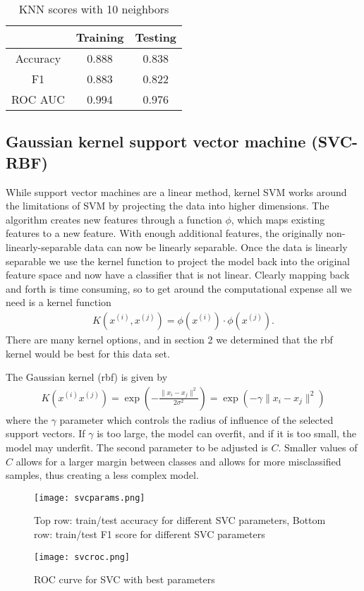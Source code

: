\documentclass[12pt]{article}
\begin{document}
\begin{table}[h!]
	\centering
	\begin{tabular}{| c|cc|} 
		\hline
		& Training & Testing\\ \hline
		Accuracy & 0.888& 0.838\\ 
		F1 &  0.883 &0.822\\ 
		ROC AUC & 0.994 & 0.976\\
		\hline
	\end{tabular}
	\caption{KNN scores with 10 neighbors}
	\label{table: 6}
\end{table}
\FloatBarrier

\subsection{Gaussian kernel support vector machine (SVC-RBF)}

While support vector machines are a linear method, kernel SVM works around the limitations of SVM by projecting the data into higher dimensions. The algorithm creates new features through a function $\phi$, which maps existing features to a new feature. With enough additional features, the originally non-linearly-separable data can now be linearly separable. Once the data is linearly separable we use the kernel function to project the model back into the original feature space and now have a classifier that is not linear. Clearly mapping back and forth is time consuming, so to get around the computational expense all we need is a kernel function
\begin{align*}
	K(x^{(i)},x^{(j)})=\phi(x^{(i)})\cdot\phi(x^{(j)}).
\end{align*}
There are many kernel options, and in section 2 we determined that the rbf kernel would be best for this data set.

The Gaussian kernel (rbf) is given by 
\begin{align*}
	K(x^{(i)}x^{(j)})=\exp\left(-\frac{\|x_i-x_j\|^2}{2\sigma^2}\right)=\exp\left(-\gamma\|x_i-x_j\|^2\right)
\end{align*}
where the $\gamma$ parameter which controls the radius of influence of the selected support vectors.   If $\gamma$ is too large, the model can overfit, and if it is too small, the model may underfit.  The second parameter to be adjusted is $ C $. Smaller values of $ C $ allows for a larger margin between classes and allows for more misclassified samples, thus creating a less complex model.

\begin{figure}[h]
	\centering
	\texttt{[image: svcparams.png]}
	\caption{Top row: train/test accuracy for different SVC parameters, Bottom row: train/test F1 score for different SVC parameters}
	\label{svcparams}
\end{figure}
\begin{figure}[h]
	\centering
	\texttt{[image: svcroc.png]}
	\caption{ROC curve for SVC with best parameters}
	\label{svcroc}
\end{figure}
\end{document}

